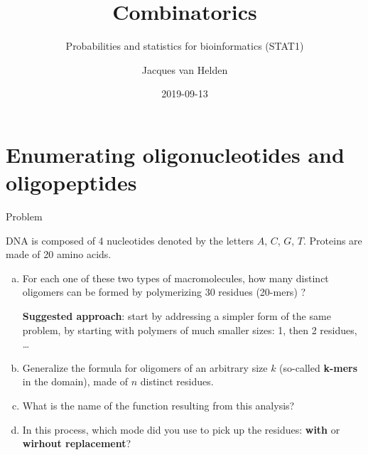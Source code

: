 \documentclass[ignorenonframetext,]{beamer}
\title{Combinatorics}
\subtitle{Probabilities and statistics for bioinformatics (STAT1)}
\author{Jacques van Helden}
\date{2019-09-13}
\begin{document}
\frame{\titlepage}

\begin{frame}
\tableofcontents[hideallsubsections]
\end{frame}
\hypertarget{enumerating-oligonucleotides-and-oligopeptides}{%
\section{Enumerating oligonucleotides and
oligopeptides}\label{enumerating-oligonucleotides-and-oligopeptides}}

\begin{frame}{Problem}
\protect\hypertarget{problem}{}

DNA is composed of 4 nucleotides denoted by the letters \(A\), \(C\),
\(G\), \(T\). Proteins are made of 20 amino acids.

\begin{enumerate}
[a.]
\item
  For each one of these two types of macromolecules, how many distinct
  oligomers can be formed by polymerizing 30 residues (20-mers) ?

  \textbf{Suggested approach}: start by addressing a simpler form of the
  same problem, by starting with polymers of much smaller sizes: 1, then
  2 residues, \ldots{}
\item
  Generalize the formula for oligomers of an arbitrary size \(k\)
  (so-called \textbf{k-mers} in the domain), made of \(n\) distinct
  residues.
\item
  What is the name of the function resulting from this analysis?
\item
  In this process, which mode did you use to pick up the residues:
  \textbf{with} or \textbf{wirhout replacement}?
\end{enumerate}

\end{frame}
\end{document}
